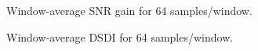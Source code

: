 

%	
%	

\begin{figure}[H]
\centering

\caption{Window-average SNR gain for 64 samples/window.}
\label{fig:lineplot_gain_64}
\end{figure}

\begin{figure}[H]
	\centering
	
	\caption{Window-average DSDI for 64 samples/window.}
	\label{fig:lineplot_dsdi_64}
\end{figure}